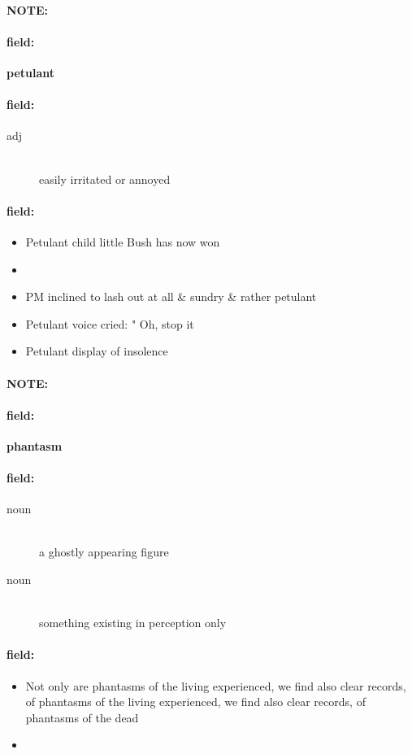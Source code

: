 \documentclass[12pt]{article}
\newenvironment{note}{\paragraph{NOTE:}}{}
\newenvironment{field}{\paragraph{field:}}{}
\begin{document}
\begin{note}
\begin{field}
\textbf{\large petulant}
\end{field}


\begin{field}
\begin{description}
\item[adj] \hfill \\ 
easily irritated or annoyed

\end{description}
\end{field}

\begin{field}
\begin{itemize}
\item Petulant child little Bush has now won
\item 
\item PM inclined to lash out at all & sundry & rather petulant
\item Petulant voice cried: " Oh, stop it
\item Petulant display of insolence
\end{itemize}
\end{field}
\end{note}
\begin{note}
\begin{field}
\textbf{\large phantasm}
\end{field}


\begin{field}
\begin{description}
\item[noun] \hfill \\ 
a ghostly appearing figure

\item[noun] \hfill \\ 
something existing in perception only

\end{description}
\end{field}

\begin{field}
\begin{itemize}
\item Not only are phantasms of the living experienced, we find also clear records, of phantasms of the living experienced, we find also clear records, of phantasms of the dead
\item 
\end{itemize}
\end{field}
\end{note}
\end{document}
